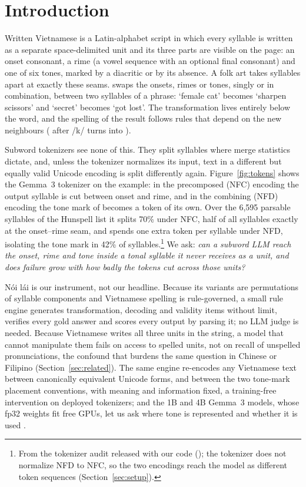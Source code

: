 \section{Introduction}
\label{sec:intro}

Written Vietnamese is a Latin-alphabet script in which every syllable is written as a separate space-delimited unit and its three parts are visible on the page: an onset consonant, a rime (a vowel sequence with an optional final consonant) and one of six tones, marked by a diacritic or by its absence. A folk art takes syllables apart at exactly these seams.  swaps the onsets, rimes or tones, singly or in combination, between two syllables of a phrase:  `female cat' becomes  `sharpen scissors' and  `secret' becomes  `got lost'. The transformation lives entirely below the word, and the spelling of the result follows rules that depend on the new neighbours ( after /k/ turns  into ).

Subword tokenizers see none of this. They split syllables where merge statistics dictate, and, unless the tokenizer normalizes its input, text in a different but equally valid Unicode encoding is split differently again. Figure~\ref{fig:tokens} shows the Gemma~3 tokenizer on the example: in the precomposed (NFC) encoding the output syllable  is cut between onset and rime, and in the combining (NFD) encoding the tone mark of  becomes a token of its own. Over the 6,595 parsable syllables of the Hunspell list it splits 70\% under NFC, half of all syllables exactly at the onset--rime seam, and spends one extra token per syllable under NFD, isolating the tone mark in 42\% of syllables.\footnote{From the tokenizer audit released with our code (\anonrepo); the tokenizer does not normalize NFD to NFC, so the two encodings reach the model as different token sequences (Section~\ref{sec:setup}).} We ask: \emph{can a subword LLM reach the onset, rime and tone inside a tonal syllable it never receives as a unit, and does failure grow with how badly the tokens cut across those units?}

Nói lái is our instrument, not our headline. Because its variants are permutations of syllable components and Vietnamese spelling is rule-governed, a small rule engine generates transformation, decoding and validity items without limit, verifies every gold answer and scores every output by parsing it; no LLM judge is needed. Because Vietnamese writes all three units in the string, a model that cannot manipulate them fails on access to spelled units, not on recall of unspelled pronunciations, the confound that burdens the same question in Chinese or Filipino (Section~\ref{sec:related}). The same engine re-encodes any Vietnamese text between canonically equivalent Unicode forms, and between the two tone-mark placement conventions, with meaning and information fixed, a training-free intervention on deployed tokenizers; and the 1B and 4B Gemma~3 models, whose fp32 weights fit free GPUs, let us ask where tone is represented and whether it is used \citep{2025-findings-emnlp-719}.

